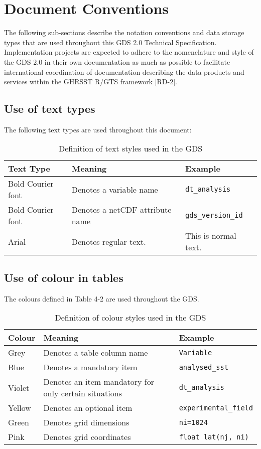 \pagebreak
\section{Document Conventions}
The following sub-sections describe the notation conventions and data storage types that are used
throughout this GDS 2.0 Technical Specification. Implementation projects are expected to adhere to
the nomenclature and style of the GDS 2.0 in their own documentation as much as possible to
facilitate international coordination of documentation describing the data products and services within
the GHRSST R/GTS framework [RD-2].

\subsection{Use of text types}
The following text types are used throughout this document:
\begin{table}[h]
\centering
\caption{Definition of text styles used in the GDS}
\label{tab:table-label}
\begin{tabular}{|p{2.5cm}|>{\raggedright}p{5.5cm}|p{3cm}|}
\hline \rowcolor{lightgray}
\textbf{Text Type} & \textbf{Meaning} & \textbf{Example} \\
\hline
Bold Courier font & Denotes a variable name & \texttt{dt\_analysis} \\
\hline
Bold Courier font & Denotes a netCDF attribute name & \texttt{gds\_version\_id} \\
\hline
Arial & Denotes regular text. & This is normal text. \\
\hline
\end{tabular}
\end{table}

\subsection{Use of colour in tables}
The colours defined in Table 4-2 are used throughout the GDS.
\begin{table}[h]
\centering
\caption{Definition of colour styles used in the GDS}
\label{tab:color-styles}
\begin{tabular}{|l|l|l|}
\hline
\rowcolor{lightgray} \textbf{Colour} & \textbf{Meaning} & \textbf{Example}\\
\hline
Grey & Denotes a table column name & \cellcolor{lightgray} \texttt{Variable}\\
\hline
Blue & Denotes a mandatory item & \cellcolor{cyan} \texttt{analysed\_sst}\\
\hline
Violet & Denotes an item mandatory for only certain situations & \cellcolor{Thistle} \texttt{dt\_analysis}\\
\hline
Yellow & Denotes an optional item & \cellcolor{Goldenrod} \texttt{experimental\_field}\\
\hline
Green & Denotes grid dimensions & \cellcolor{YellowGreen} \texttt{ni=1024}\\
\hline
Pink & Denotes grid coordinates & \cellcolor{Apricot} \texttt{float lat(nj, ni)}\\
\hline
\end{tabular}
\end{table}

